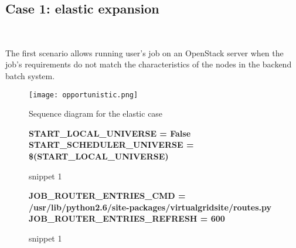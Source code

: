 \documentclass[a4paper]{jpconf}
\begin{document}



\subsection{Case 1: elastic expansion}

~

The first scenario allows running user's job on an OpenStack server when the job's requirements 
do not match the characteristics of the nodes in the backend batch system. 




\begin{figure}[h]
    \centering
    \texttt{[image: opportunistic.png]}
    \caption{Sequence diagram for the elastic case}
    \label{fig:elastic}
\end{figure}



\begin{figure}[h!]
    \colorbox{htcondorbox}{
        \begin{minipage}{\textwidth}
        \small
            \bf{START\_LOCAL\_UNIVERSE = False  \newline
                START\_SCHEDULER\_UNIVERSE = \$(START\_LOCAL\_UNIVERSE)
            }
        \end{minipage}
    }
\caption{snippet 1}
\label{snippet1}
\end{figure}



\begin{figure}[h!]
    \colorbox{htcondorbox}{
        \begin{minipage}{\textwidth}
        \small
            \bf{JOB\_ROUTER\_ENTRIES\_CMD = \newline 
                \hspace*{1cm}/usr/lib/python2.6/site-packages/virtualgridsite/routes.py \newline
                JOB\_ROUTER\_ENTRIES\_REFRESH = 600
            }
        \end{minipage}
    }
\caption{snippet 1}
\label{snippet1}
\end{figure}
\end{document}
